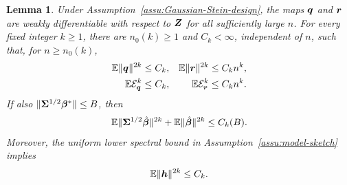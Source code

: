 \documentclass{article}
\theoremstyle{plain} %
\newtheorem{lemma}[theorem]{Lemma}
\theoremstyle{definition} %
\theoremstyle{definition} %
\begin{document}
\begin{lemma}
\label{lem:balanced-moment-bounds}
Under Assumption~\ref{assu:Gaussian-Stein-design}, the maps $\boldsymbol{q}$ and $\boldsymbol{r}$
are weakly differentiable with respect to $\boldsymbol{Z}$ for all sufficiently
large $n$.
For every fixed integer $k\geq1$, there are $n_0(k)\geq1$ and
$C_k<\infty$, independent of $n$, such that, for $n\geq n_0(k)$,
\begin{align}
    {\mathbb{E}}\lVert\boldsymbol{q}\rVert^{2k}&\leq C_k,
    & {\mathbb{E}}\lVert\boldsymbol{r}\rVert^{2k}&\leq C_kn^k,\notag\\
    {\mathbb{E}}{\mathcal E}_{\boldsymbol{q}}^{k}&\leq C_k,
    & {\mathbb{E}}{\mathcal E}_{\boldsymbol{r}}^{k}&\leq C_kn^k.
    \label{eq:balanced-explicit-moment-bounds}
\end{align}
If also $\lVert\boldsymbol{\Sigma}^{1/2}\boldsymbol{\beta}^*\rVert\leq B$, then
\begin{align*}
    {\mathbb{E}}\lVert\boldsymbol{\Sigma}^{1/2}\hat{\boldsymbol{\beta}}{}\rVert^{2k}
    +{\mathbb{E}}\lVert\hat{\boldsymbol{\beta}}{}\rVert^{2k}
    \leq C_k(B).
\end{align*}
Moreover, the uniform lower spectral bound in
Assumption~\ref{assu:model-sketch} implies
\begin{align*}
    {\mathbb{E}}\lVert\boldsymbol{h}\rVert^{2k}\leq C_k.
\end{align*}
\end{lemma}
\end{document}
